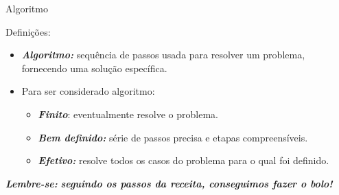 \documentclass{beamer}
\begin{document}
\begin{frame}{Algoritmo}
	
	Definições:
	
	\begin{itemize}
		\item \textbf{\textit{Algoritmo:}} sequência de passos usada para resolver um problema, fornecendo uma solução específica.
		\item Para ser considerado algoritmo:
		\begin{itemize}
			\item \textbf{\textit{Finito}}: eventualmente resolve o problema. 
			\item \textbf{\textit{Bem definido: }} série de passos precisa e etapas compreensíveis. 
			\item \textbf{\textit{Efetivo: }} resolve todos os casos do problema para o qual foi definido. 
		\end{itemize}
	\end{itemize}
	\alert{\textbf{\textit{Lembre-se:}}} \textbf{\textit{seguindo os passos da receita, conseguimos fazer o bolo!}}
\end{frame}
\end{document}

